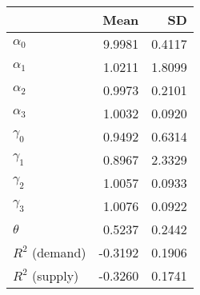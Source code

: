 
\begin{tabular}[t]{lrr}
\toprule
  & Mean & SD\\
\midrule
$\alpha_{0}$ & 9.9981 & 0.4117\\
$\alpha_{1}$ & 1.0211 & 1.8099\\
$\alpha_{2}$ & 0.9973 & 0.2101\\
$\alpha_{3}$ & 1.0032 & 0.0920\\
$\gamma_{0}$ & 0.9492 & 0.6314\\
$\gamma_{1}$ & 0.8967 & 2.3329\\
$\gamma_{2}$ & 1.0057 & 0.0933\\
$\gamma_{3}$ & 1.0076 & 0.0922\\
$\theta$ & 0.5237 & 0.2442\\
$R^{2}$ (demand) & -0.3192 & 0.1906\\
$R^{2}$ (supply) & -0.3260 & 0.1741\\
\bottomrule
\end{tabular}
